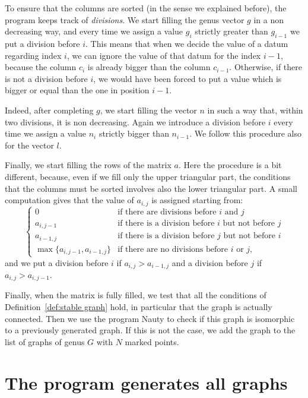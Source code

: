 \documentclass{amsart}
\theoremstyle{plain}
\theoremstyle{definition}
\begin{document}
To ensure that the columns are sorted (in the sense we explained
before), the program keeps track of \emph{divisions}. We start filling
the genus vector $g$ in a non decreasing way, and every time we assign
a value $g_i$ strictly greater than $g_{i-1}$ we put a division before
$i$. This means that when we decide the value of a datum regarding
index $i$, we can ignore the value of that datum for the index $i-1$,
because the column $c_i$ is already bigger than the column
$c_{i-1}$. Otherwise, if there is not a division before $i$, we would
have been forced to put a value which is bigger or equal than the one
in position $i-1$.

Indeed, after completing $g$, we start filling the vector $n$ in such
a way that, within two divisions, it is non decreasing. Again we
introduce a division before $i$ every time we assign a value $n_i$
strictly bigger than $n_{i-1}$. We follow this procedure also for the
vector $l$.

Finally, we start filling the rows of the matrix $a$. Here the
procedure is a bit different, because, even if we fill only the upper
triangular part, the conditions that the columns must be sorted
involves also the lower triangular part. A small computation gives
that the value of $a_{i,j}$ is assigned starting from:
\[
\begin{cases}
  0 & \text{if there are divisions before $i$ and $j$}\\
  a_{i,j-1} & \text{if there is a division before $i$ but not before
    $j$}\\
  a_{i-1,j} & \text{if there is a division before $j$ but not before
    $i$}\\
  \max\{a_{i,j-1}, a_{i-1,j}\} & \text{if there are no divisions
    before $i$ or $j$,}
\end{cases}
\]
and we put a division before $i$ if $a_{i,j} > a_{i-1,j}$ and a division
before $j$ if $a_{i,j} > a_{i,j-1}$.

Finally, when the matrix is fully filled, we test that all the
conditions of Definition~\ref{def:stable graph} hold, in particular
that the graph is actually connected. Then we use the program Nauty
\cite{nauty} to check if this graph is isomorphic to a previously
generated graph. If this is not the case, we add the graph to the list
of graphs of genus $G$ with $N$ marked points.




\section{The program generates all graphs}\label{sec:proof}
\end{document}
